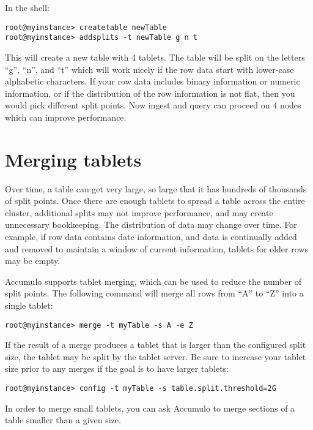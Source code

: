 In the shell:

\begingroup\fontsize{8pt}{8pt}\selectfont\begin{verbatim}
root@myinstance> createtable newTable
root@myinstance> addsplits -t newTable g n t
\end{verbatim}\endgroup

This will create a new table with 4 tablets. The table will be split
on the letters ``g'', ``n'', and ``t'' which will work nicely if the
row data start with lower-case alphabetic characters. If your row
data includes binary information or numeric information, or if the
distribution of the row information is not flat, then you would pick
different split points. Now ingest and query can proceed on 4 nodes
which can improve performance.

\section{Merging tablets}

Over time, a table can get very large, so large that it has hundreds
of thousands of split points. Once there are enough tablets to spread
a table across the entire cluster, additional splits may not improve
performance, and may create unnecessary bookkeeping. The distribution
of data may change over time. For example, if row data contains date
information, and data is continually added and removed to maintain a
window of current information, tablets for older rows may be empty.

Accumulo supports tablet merging, which can be used to reduce 
the number of split points. The following command will merge all rows
from ``A'' to ``Z'' into a single tablet:

\begingroup\fontsize{8pt}{8pt}\selectfont\begin{verbatim}
root@myinstance> merge -t myTable -s A -e Z
\end{verbatim}\endgroup

If the result of a merge produces a tablet that is larger than the
configured split size, the tablet may be split by the tablet server.
Be sure to increase your tablet size prior to any merges if the goal
is to have larger tablets:

\begingroup\fontsize{8pt}{8pt}\selectfont\begin{verbatim}
root@myinstance> config -t myTable -s table.split.threshold=2G
\end{verbatim}\endgroup

In order to merge small tablets, you can ask Accumulo to merge
sections of a table smaller than a given size.

